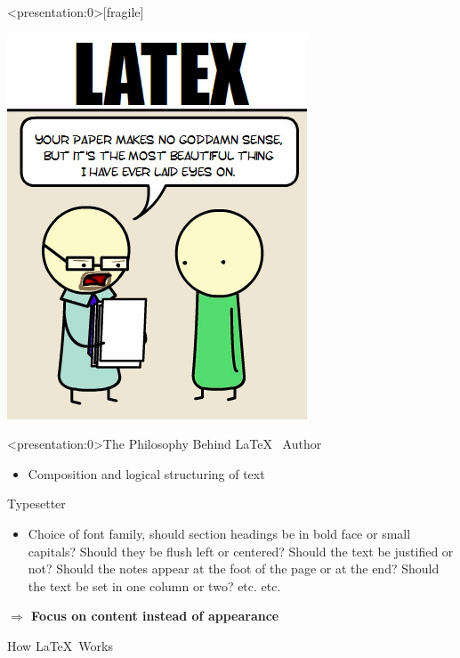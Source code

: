 \documentclass[table]{beamer}
\newcommand{\latex}{\LaTeX\ }
\begin{document}
\begin{frame}<presentation:0>[fragile]
    \begin{center}
    \includegraphics[width=.5\linewidth]{resource/latex-comic}
    \end{center}
\end{frame}

\begin{frame}<presentation:0>{The Philosophy Behind \latex}
    Author
    \begin{itemize}
        \item Composition and logical structuring of text
    \end{itemize}

    Typesetter
    \begin{itemize}
        \item Choice of font family, should section headings be in bold face or
        small capitals? Should they be flush left or centered? Should the text
        be justified or not? Should the notes appear at the foot of the page or
        at the end? Should the text be set in one column or two? etc. etc.
    \end{itemize}
\vspace{1em}
    \textbf{$\Rightarrow$ Focus on content instead of appearance}
\end{frame}

\begin{frame}{How \latex Works}
    \begin{center}
        
    \end{center}
\end{frame}
\end{document}

